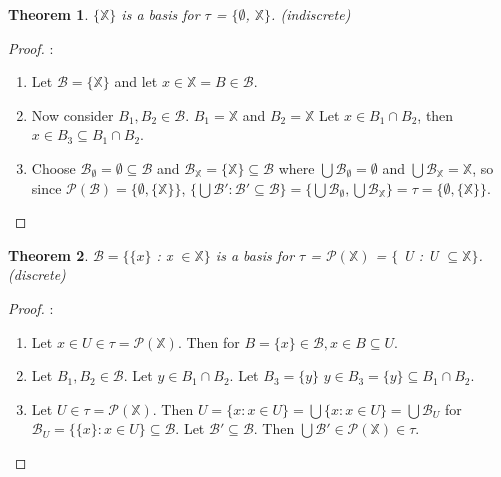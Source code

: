 \documentclass{amsart}
\theoremstyle{plain}
\newtheorem{theorem}{Theorem}
\theoremstyle{definition}
\theoremstyle{remark}
\begin{document}
	\begin{theorem}
	$\lbrace\mathbb{X}\rbrace$ is a basis for $\tau$ = $\lbrace\emptyset$, $\mathbb{X}\rbrace$. (indiscrete)
	\end{theorem}
	\begin{proof}:\newline
	\begin{enumerate}
		\item Let $\mathcal{B} = \lbrace\mathbb{X}\rbrace$ and let $x \in \mathbb{X} = B \in \mathcal{B}$.
		\item Now consider $B_1, B_2 \in \mathcal{B}$. $B_1 = \mathbb{X}$ and $B_2 = \mathbb{X}$ Let $x \in B_1 \cap B_2$, then $x \in B_3 \subseteq B_1 \cap B_2$.
		\item Choose $\mathcal{B}_\emptyset = \emptyset \subseteq \mathcal{B}$ and $\mathcal{B}_\mathbb{X} = \lbrace \mathbb{X} \rbrace \subseteq \mathcal{B}$ where $\bigcup \mathcal{B}_\emptyset = \emptyset$ and $\bigcup \mathcal{B}_\mathbb{X} = \mathbb{X}$, so since $\mathcal{P}(\mathcal{B}) = \lbrace \emptyset, \lbrace \mathbb{X} \rbrace \rbrace$, $\lbrace \bigcup \mathcal{B'} : \mathcal{B'} \subseteq \mathcal{B} \rbrace = \lbrace \bigcup \mathcal{B}_\emptyset, \bigcup \mathcal{B}_\mathbb{X} \rbrace = \tau = \lbrace \emptyset, \lbrace \mathbb{X} \rbrace \rbrace$.
	\end{enumerate}
	\end{proof}

	\begin{theorem}
	$\mathcal{B} = \lbrace\lbrace x \rbrace$ : x $\in \mathbb{X}\rbrace$ is a basis for $\tau$ = $\mathcal{P}(\mathbb{X})$ = $\lbrace$ U : U $\subseteq \mathbb{X} \rbrace$. (discrete)
	\end{theorem}
	\begin{proof}:\newline
		\begin{enumerate}
			\item Let $x \in U \in \tau = \mathcal{P}(\mathbb{X})$. Then for $B = \lbrace x \rbrace \in \mathcal{B}, x \in B \subseteq U$.
			\item Let $B_1, B_2 \in \mathcal{B}$. Let $y \in B_1 \cap B_2$. Let $B_3 = \lbrace y \rbrace$ $y \in B_3 = \lbrace y \rbrace \subseteq B_1 \cap B_2$. 
			\item Let $U \in \tau = \mathcal{P} ( \mathbb{X} )$. Then $U = \lbrace x : x \in U \rbrace = \bigcup \lbrace x : x \in U \rbrace = \bigcup \mathcal{B}_U$ for $\mathcal{B}_U = \lbrace \lbrace x \rbrace : x \in U \rbrace \subseteq \mathcal{B}$.
			\newline Let $\mathcal{B'} \subseteq \mathcal{B}$. Then $\bigcup \mathcal{B'} \in \mathcal{P}(\mathbb{X}) \in \tau$.
		\end{enumerate}
	\end{proof}
\end{document}
